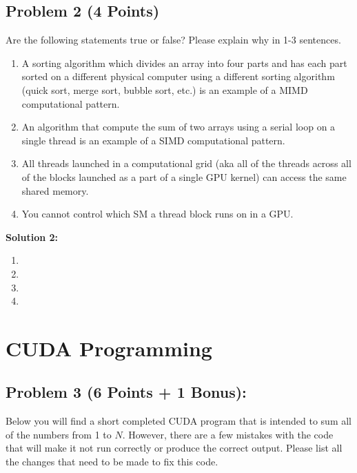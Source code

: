 \documentclass[]{article}
\begin{document}
\subsection*{Problem 2 (4 Points)}
Are the following statements true or false? Please explain why in 1-3 sentences.

\begin{enumerate}[label=(\alph*)]
    \item A sorting algorithm which divides an array into four parts and has each part sorted on a different physical computer using a different sorting algorithm (quick sort, merge sort, bubble sort, etc.) is an example of a MIMD computational pattern.
    \item An algorithm that compute the sum of two arrays using a serial loop on a single thread is an example of a SIMD computational pattern.
    \item All threads launched in a computational grid (aka all of the threads across all of the blocks launched as a part of a single GPU kernel) can access the same shared memory.
    \item You cannot control which SM a thread block runs on in a GPU.
\end{enumerate}

\textbf{Solution 2:}
\begin{enumerate}[label=(\alph*)]
    \item %
    \item %
    \item %
    \item %
\end{enumerate}

\clearpage
\section{CUDA Programming}

\subsection*{Problem 3 (6 Points + 1 Bonus):}
Below you will find a short completed CUDA program that is intended to sum all of the numbers from 1 to $N$. However, there are a few mistakes with the code that will make it not run correctly or produce the correct output. Please list all the changes that need to be made to fix this code.
\end{document}
